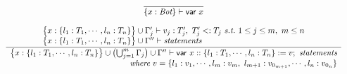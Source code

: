\documentclass[12pt]{article}
\begin{document}
\begin{displaymath}
\begin{array}{c}
    \begin{array}{c}
      \dfrac{}{
        \{x : \text{\it Bot} \} \vdash \mathsf{var}\ x
      }
    \end{array}  \\
    \\

    \begin{array}{c}
      \dfrac{
        \begin{array}{l}
          \bigl\{x : \{l_1:T_1, \cdots ,l_n:T_n\} \bigr\} \cup
          \Gamma'_j \vdash v_j : T'_j,\ T'_j <: T_j\ \text{\it s.t.}\
          1 \le j \le m,\ m \le n  \\
          \bigl\{x : \{l_1:T_1, \cdots ,l_n:T_n\} \bigr\} \cup \Gamma''
          \vdash \text{\it statements}
        \end{array}
      }{
        \begin{array}{r}
          \bigl\{x : \{l_1:T_1, \cdots ,l_n:T_n\} \bigr\} \cup \bigl(
          \bigcup_{j=1}^m \Gamma_j \bigr) \cup \Gamma'' \vdash
          \mathsf{var}\ x :: \{l_1:T_1,\cdots ,l_n:T_n\} := v;\
          \text{\it statements}  \\
          \text{\it where}\ v = \{ l_1:v_1,\cdots ,l_m:v_m,\
          l_{m+1}:v_{0_{m+1}},\cdots ,l_n:v_{0_n} \}
        \end{array}
      }
    \end{array}
  \end{array}
\end{displaymath}
\end{document}
